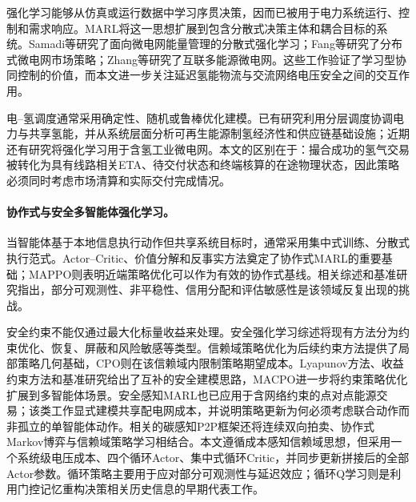 \documentclass[final,5p,times]{elsarticle}
\begin{document}
强化学习能够从仿真或运行数据中学习序贯决策，因而已被用于电力系统运行、控制和需求响应\cite{glavic2017reinforcement,cao2020review,bahrami2021demand,vazquez2019demand,francois2018deep}。MARL将这一思想扩展到包含分散式决策主体和耦合目标的系统。Samadi等\cite{samadi2020decentralized}研究了面向微电网能量管理的分散式强化学习；Fang等\cite{fang2021multiagent}研究了分布式微电网市场策略；Zhang等\cite{zhang2023interconnected}研究了互联多能源微电网。这些工作验证了学习型协同控制的价值，而本文进一步关注延迟氢能物流与交流网络电压安全之间的交互作用。

电--氢调度通常采用确定性、随机或鲁棒优化建模。已有研究利用分层调度协调电力与共享氢能\cite{li2023hierarchical}，并从系统层面分析可再生能源制氢经济性和供应链基础设施\cite{glenk2019economics,almansoori2009supply,moreno2017infrastructure}；近期还有研究将强化学习用于含氢工业微电网\cite{he2025hydrogen}。本文的区别在于：撮合成功的氢气交易被转化为具有线路相关ETA、待交付状态和终端核算的在途物理状态，因此策略必须同时考虑市场清算和实际交付完成情况。

\paragraph{协作式与安全多智能体强化学习。}

当智能体基于本地信息执行动作但共享系统目标时，通常采用集中式训练、分散式执行范式。Actor--Critic、价值分解和反事实方法奠定了协作式MARL的重要基础\cite{lowe2017maddpg,sunehag2018vdn,rashid2020qmix,foerster2018coma}；MAPPO则表明近端策略优化可以作为有效的协作式基线\cite{schulman2017ppo,yu2022mappo}。相关综述和基准研究指出，部分可观测性、非平稳性、信用分配和评估敏感性是该领域反复出现的挑战\cite{gronauer2022survey,hernandez2019survey,oroojlooy2023review,papoudakis2021benchmark}。

安全约束不能仅通过最大化标量收益来处理。安全强化学习综述将现有方法分为约束优化、恢复、屏蔽和风险敏感等类型\cite{garcia2015safe}。信赖域策略优化为后续约束方法提供了局部策略几何基础\cite{schulman2015trpo}，CPO则在该信赖域内限制策略期望成本\cite{achiam2017cpo}。Lyapunov方法、收益约束方法和基准研究给出了互补的安全建模思路\cite{chow2018lyapunov,tessler2019reward,ray2019benchmark}，MACPO进一步将约束策略优化扩展到多智能体场景\cite{gu2021macpo}。安全感知MARL也已应用于含网络约束的点对点能源交易\cite{ma2025network}；该类工作显式建模共享配电网成本，并说明策略更新为何必须考虑联合动作而非孤立的单智能体动作。相关的碳感知P2P框架还将连续双向拍卖、协作式Markov博弈与信赖域策略学习相结合\cite{liu2025carbon}。本文遵循成本感知信赖域思想，但采用一个系统级电压成本、四个循环Actor、集中式循环Critic，并同步更新拼接后的全部Actor参数。循环策略主要用于应对部分可观测性与延迟效应；循环Q学习则是利用门控记忆重构决策相关历史信息的早期代表工作\cite{hausknecht2015drqn}。
\end{document}
